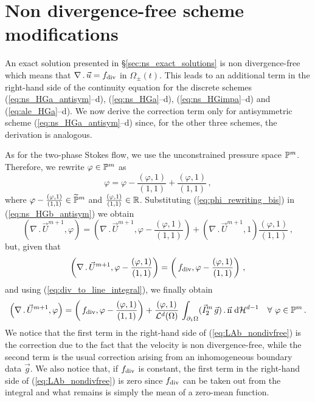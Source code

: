 \section{Non divergence-free scheme modifications}\label{sec:ns_non_div_free}
An exact solution presented in \S\ref{sec:ns_exact_solutions} is non
divergence-free which means that $\nabla\,.\,\vec u = f_{\rm{div}}$ in
$\Omega_\pm(t)$. This leads to an additional term in the right-hand side of the
continuity equation for the discrete schemes (\ref{eq:ns_HGa_antisym}--d),
(\ref{eq:ns_HGa}--d), (\ref{eq:ns_HGimpa}--d) and (\ref{eq:ale_HGa}--d). We
now derive the correction term only for antisymmetric scheme
(\ref{eq:ns_HGa_antisym}--d) since, for the other three schemes, the
derivation is analogous.

As for the two-phase Stokes flow, we use the unconstrained pressure space
$\mathbb{P}^m$. Therefore, we rewrite $\varphi\in \mathbb{P}^m$ as
\begin{equation}\label{eq:phi_rewriting_bis}
\varphi=\varphi-\frac{\left(\varphi,1\right)}{\left(1,1\right)}
+\frac{\left(\varphi,1\right)}{\left(1,1\right)}\,,
\end{equation}
where $\varphi-\frac{(\varphi,1)}{(1,1)}\in\widetilde{\mathbb{P}}^m$ and
$\frac{(\varphi,1)}{(1,1)}\in\mathbb R$. Substituting (\ref{eq:phi_rewriting_bis}) in
(\ref{eq:ns_HGb_antisym}) we obtain
\begin{equation}
\left(\nabla\,.\,\vec U^{m+1}, \varphi\right)  =
\left(\nabla\,.\,\vec U^{m+1},
\varphi-\frac{\left(\varphi,1\right)}{\left(1,1\right)}\right) +
\left(\nabla\,.\,\vec U^{m+1},1\right)
\frac{\left(\varphi,1\right)}{\left(1,1\right)}\,,
\end{equation}
but, given that
\begin{equation}
\left(\nabla\,.\,\vec U^{m+1},
\varphi-\frac{\left(\varphi,1\right)}{\left(1,1\right)}\right) =
\left(\,f_{\rm{div}},
\varphi-\frac{\left(\varphi,1\right)}{\left(1,1\right)}\right)\,,
\end{equation}
and using (\ref{eq:div_to_line_integral}), we finally obtain
\begin{equation}\label{eq:LAb_nondivfree}
\left(\nabla\,.\,\vec U^{m+1}, \varphi\right) =
\left(\,f_{\rm{div}},
\varphi-\frac{\left(\varphi,1\right)}{\left(1,1\right)}\right)+
\frac{\left(\varphi, 1\right)}{\mathcal{L}^d(\Omega)}\, \int_{\partial_1\Omega}
(\vec I^m_2\,\vec g) \,.\, \vec{\rm n} \;{\rm d}{\cal H}^{d-1} \quad \forall\ \varphi \in
\mathbb{P}^m\,.
\end{equation}
We notice that the first term in the right-hand side of
(\ref{eq:LAb_nondivfree}) is the correction due to the fact that the velocity is
non divergence-free, while the second term is the usual correction arising
from an inhomogeneous boundary data $\vec g$. We also notice that, if
$f_{\rm{div}}$ is constant, the first term in the right-hand side of
(\ref{eq:LAb_nondivfree}) is zero since $f_{\rm{div}}$ can be taken out
from the integral and what remains is simply the mean of a zero-mean function.

